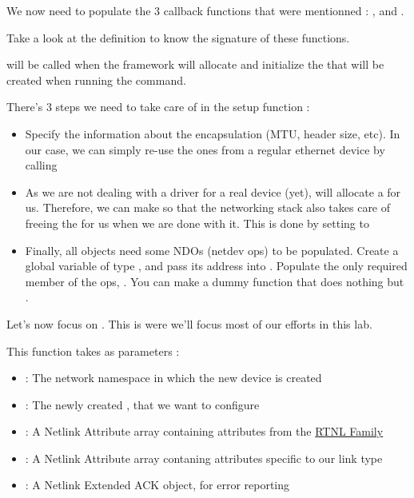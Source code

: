  We now need to populate the 3 callback functions that were mentionned : ,  and .
 
 Take a look at the  definition to know the signature of these functions.
 
  will be called when the  framework will allocate and initialize
 the  that will be created when running the  command.
 
 There's 3 steps we need to take care of in the setup function :
 \begin{itemize}
 	\item Specify the  information about the encapsulation (MTU, header size, etc). In our case, we can simply re-use the ones from a regular ethernet device by calling 
 	\item As we are not dealing with a driver for a real device (yet),  will allocate a  for us. Therefore, we can make so that the networking stack also takes care of freeing the  for us when we are done with it. This is done by setting  to 
	\item Finally, all  objects need some NDOs (netdev ops) to be populated. Create a global variable of type , and pass its address into . Populate the only required member of the ops, . You can make a dummy function that does nothing but .
 \end{itemize}

 Let's now focus on . This is were we'll focus most of our efforts in this lab.

 This function takes as parameters :
 \begin{itemize}
	 \item {} : The network namespace in which the new device is created
	 \item {} : The newly created , that we want to configure
	 \item {} : A Netlink Attribute array containing attributes from the \href{https://elixir.bootlin.com/linux/v6.12.32/A/ident/IFLA_LINK}{RTNL Family}
	 \item {} : A Netlink Attribute array contaning attributes specific to our link type
	 \item {} : A Netlink Extended ACK object, for error reporting
 \end{itemize}

